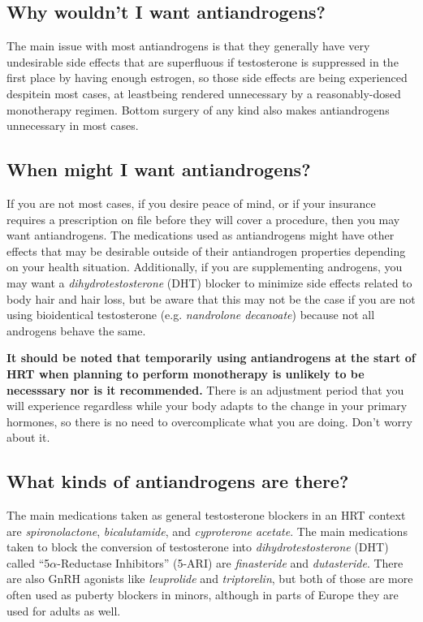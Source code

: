 \documentclass{article}
\begin{document}
\subsection{Why wouldn’t I want antiandrogens?}

The main issue with most antiandrogens is that they generally have very undesirable side effects that are superfluous if testosterone is suppressed in the first place by having enough estrogen, so those side effects are being experienced despite\textemdash{}in most cases, at least\textemdash{}being rendered unnecessary by a reasonably-dosed monotherapy regimen. Bottom surgery of any kind also makes antiandrogens unnecessary in most cases.

\subsection{When might I want antiandrogens?}

If you are not most cases, if you desire peace of mind, or if your insurance requires a prescription on file before they will cover a procedure, then you may want antiandrogens. The medications used as antiandrogens might have other effects that may be desirable outside of their antiandrogen properties depending on your health situation. Additionally, if you are supplementing androgens, you may want a \textit{dihydrotestosterone }(DHT) blocker to minimize side effects related to body hair and hair loss, but be aware that this may not be the case if you are not using bioidentical testosterone (e.g. \textit{nandrolone decanoate}) because not all androgens behave the same.

\textbf{It should be noted that temporarily using antiandrogens at the start of HRT when planning to perform monotherapy is unlikely to be necesssary nor is it recommended.} There is an adjustment period that you will experience regardless while your body adapts to the change in your primary hormones, so there is no need to overcomplicate what you are doing. Don't worry about it.

\subsection{What kinds of antiandrogens are there?}

The main medications taken as general testosterone blockers in an HRT context are \textit{spironolactone}, \textit{bicalutamide}, and \textit{cyproterone acetate}. The main medications taken to block the conversion of testosterone into \textit{dihydrotestosterone} (DHT) called “5$\alpha$-Reductase Inhibitors” (5-ARI) are \textit{finasteride} and \textit{dutasteride}. There are also GnRH agonists like \textit{leuprolide} and \textit{triptorelin}, but both of those are more often used as puberty blockers in minors, although in parts of Europe they are used for adults as well.
\end{document}
